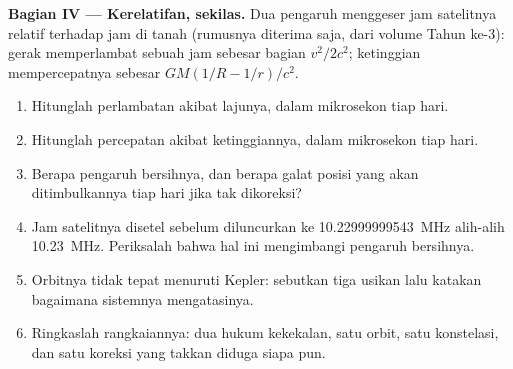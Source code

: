 \begin{problem}
\medskip
\noindent\textbf{Bagian IV --- Kerelatifan, sekilas.}
Dua pengaruh menggeser jam satelitnya relatif terhadap jam di tanah
(rumusnya diterima saja, dari volume Tahun ke-3): gerak memperlambat
sebuah jam sebesar bagian $v^2/2c^2$; ketinggian mempercepatnya sebesar
$GM(1/R - 1/r)/c^2$.
\begin{enumerate}[resume]
  \item Hitunglah perlambatan akibat lajunya, dalam mikrosekon tiap hari.
  \item Hitunglah percepatan akibat ketinggiannya, dalam mikrosekon tiap
        hari.
  \item Berapa pengaruh bersihnya, dan berapa galat posisi yang akan
        ditimbulkannya tiap hari jika tak dikoreksi?
  \item Jam satelitnya disetel sebelum diluncurkan ke
        \qty{10.22999999543}{MHz} alih-alih \qty{10.23}{MHz}. Periksalah
        bahwa hal ini mengimbangi pengaruh bersihnya.
  \item Orbitnya tidak tepat menuruti Kepler: sebutkan tiga usikan lalu
        katakan bagaimana sistemnya mengatasinya.
  \item Ringkaslah rangkaiannya: dua hukum kekekalan, satu orbit, satu
        konstelasi, dan satu koreksi yang takkan diduga siapa pun.
\end{enumerate}
\end{problem}
